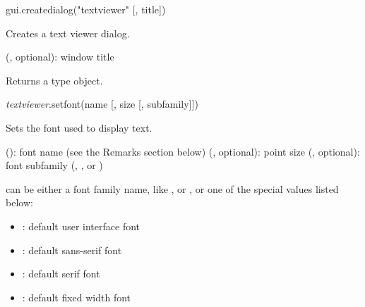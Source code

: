 \documentclass[a4paper,12pt,twoside,extrafontsizes]{memoir}
\begin{document}

\begin{luafuncprototype}
gui.createdialog("textviewer" [, title])
\end{luafuncprototype}

\begin{funcdescr}
	Creates a text viewer dialog.
\end{funcdescr}

\begin{funcparams}
	 (, optional): window title
\end{funcparams}

\begin{funcret}
	Returns a  type object.
\end{funcret}


\begin{luafuncprototype}
\emph{textviewer}.setfont(name [, size [, subfamily]])
\end{luafuncprototype}

\begin{funcdescr}
	Sets the font used to display text.
\end{funcdescr}

\begin{funcparams}
	 (): font name (see the Remarks section below)
	 (, optional): point size
	 (, optional): font subfamily (, ,  or )
\end{funcparams}

\begin{funcremarks}
	 can be either a font family name, like ,  or , or one of the special values listed below:
	
	\begin{itemize}
		\item {}: default user interface font
		\item {}: default sans-serif font
		\item {}: default serif font
		\item {}: default fixed width font
	\end{itemize}
\end{funcremarks}
\end{document}
